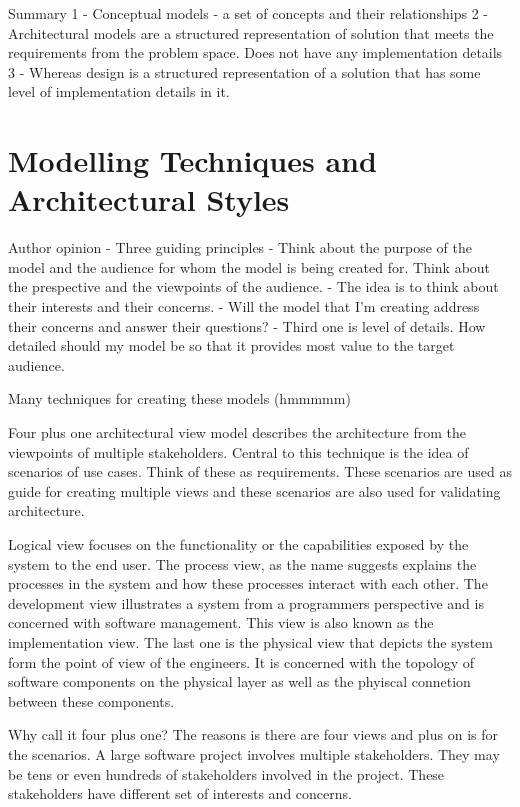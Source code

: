 \documentclass[a4paper, 11pt]{book}
\begin{document}
    Summary
    1 - Conceptual models - a set of concepts and their relationships
    2 - Architectural models are a structured representation of solution that meets the requirements from the problem space. Does not have any implementation details
    3 - Whereas design is a structured representation of a solution that has some level of implementation details in it.


    \section{Modelling Techniques and Architectural Styles}
    Author opinion
    - Three guiding principles
    - Think about the purpose of the model and the audience for whom the model is being created for. Think about the prespective and the viewpoints of the audience.
    - The idea is to think about their interests and their concerns.
    - Will the model that I'm creating address their concerns and answer their questions?
    - Third one is level of details. How detailed should my model be so that it provides most value to the target audience.

    Many techniques for creating these models (hmmmmm)

    Four plus one architectural view model describes the architecture from the viewpoints of multiple stakeholders.
    Central to this technique is the idea of scenarios of use cases. Think of these as requirements.
    These scenarios are used as guide for creating multiple views and these scenarios are also used for validating architecture.

    Logical view focuses on the functionality or the capabilities exposed by the system to the end user.
    The process view, as the name suggests explains the processes in the system and how these processes interact with each other.
    The development view illustrates a system from a programmers perspective and is concerned with software management. This view is also known as the implementation view.
    The last one is the physical view that depicts the system form the point of view of the engineers.
    It is concerned with the topology of software components on the physical layer as well as the phyiscal connetion between these components.


    Why call it four plus one?
    The reasons is there are four views and plus on is for the scenarios.
    A large software project involves multiple stakeholders.
    They may be tens or even hundreds of stakeholders involved in the project.
    These stakeholders have different set of interests and concerns.
\end{document}
